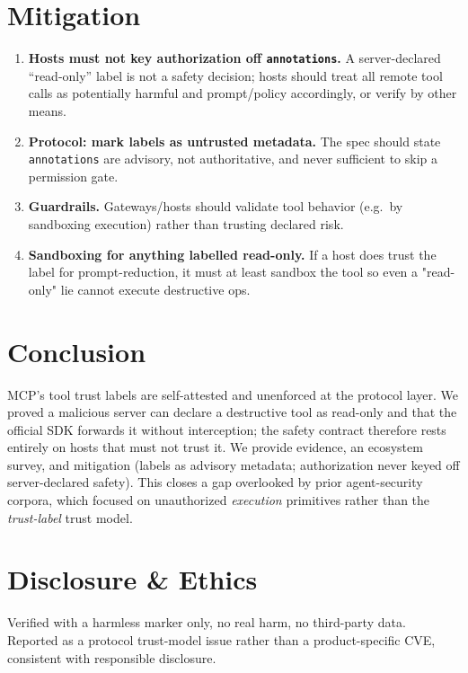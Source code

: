 \documentclass{llncs}
\begin{document}
\section{Mitigation}\label{sec:mitigation}
\begin{enumerate}
    \item \textbf{Hosts must not key authorization off \texttt{annotations}.} A server-declared ``read-only'' label is not a safety decision; hosts should treat all remote tool calls as potentially harmful and prompt/policy accordingly, or verify by other means.
    \item \textbf{Protocol: mark labels as untrusted metadata.} The spec should state \texttt{annotations} are advisory, not authoritative, and never sufficient to skip a permission gate.
    \item \textbf{Guardrails.} Gateways/hosts should validate tool behavior (e.g.\ by sandboxing execution) rather than trusting declared risk.
    \item \textbf{Sandboxing for anything labelled read-only.} If a host does trust the label for prompt-reduction, it must at least sandbox the tool so even a "read-only" lie cannot execute destructive ops.
\end{enumerate}

\section{Conclusion}\label{sec:conclusion}
MCP's tool trust labels are self-attested and unenforced at the protocol layer. We proved a malicious server can declare a destructive tool as read-only and that the official SDK forwards it without interception; the safety contract therefore rests entirely on hosts that must not trust it. We provide evidence, an ecosystem survey, and mitigation (labels as advisory metadata; authorization never keyed off server-declared safety). This closes a gap overlooked by prior agent-security corpora, which focused on unauthorized \emph{execution} primitives rather than the \emph{trust-label} trust model.

\section{Disclosure \& Ethics}\label{sec:disclosure}
Verified with a harmless marker only, no real harm, no third-party data. Reported as a protocol trust-model issue rather than a product-specific CVE, consistent with responsible disclosure.



\end{document}
